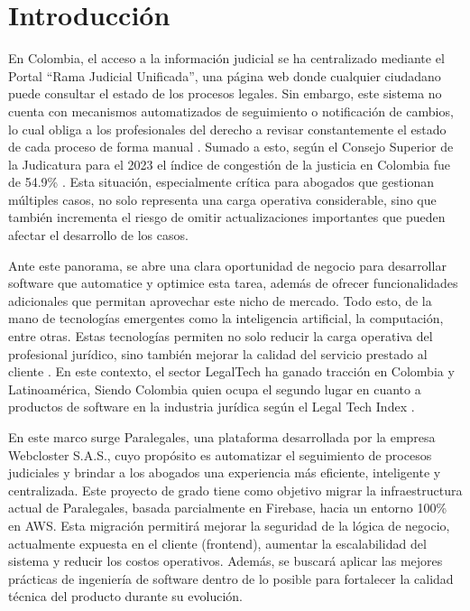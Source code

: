 \newpage
\section{Introducción}

En Colombia, el acceso a la información judicial se ha centralizado mediante el Portal  “Rama Judicial Unificada”, una página web donde cualquier ciudadano puede consultar el estado de los procesos legales. Sin embargo, este sistema no cuenta con mecanismos automatizados de seguimiento o notificación de cambios, lo cual obliga a los profesionales del derecho a revisar constantemente el estado de cada proceso de forma manual \cite{Paez2024}. Sumado a esto,  según el Consejo Superior de la Judicatura para el 2023 el índice de congestión de la justicia en Colombia fue de 54.9\% \cite{Rozo2024}. Esta situación, especialmente crítica para abogados que gestionan múltiples casos, no solo representa una carga operativa considerable, sino que también incrementa el riesgo de omitir actualizaciones importantes que pueden afectar el desarrollo de los casos.

Ante este panorama, se abre una clara oportunidad de negocio para desarrollar software que automatice y optimice esta tarea, además de ofrecer funcionalidades adicionales que permitan aprovechar este nicho de mercado. Todo esto, de la mano de tecnologías emergentes como la inteligencia artificial, la computación, entre otras. Estas tecnologías permiten no solo reducir la carga operativa del profesional jurídico, sino también mejorar la calidad del servicio prestado al cliente \cite{Botero2023}. En este contexto, el sector LegalTech ha ganado tracción en Colombia y Latinoamérica, Siendo Colombia quien ocupa el segundo lugar en cuanto a productos de software en la industria jurídica según el Legal Tech Index \cite{Sierra2023}.

En este marco surge Paralegales, una plataforma desarrollada por la empresa Webcloster S.A.S., cuyo propósito es automatizar el seguimiento de procesos judiciales y brindar a los abogados una experiencia más eficiente, inteligente y centralizada. Este proyecto de grado tiene como objetivo migrar la infraestructura actual de Paralegales, basada parcialmente en Firebase, hacia un entorno 100\% en AWS. Esta migración permitirá mejorar la seguridad de la lógica de negocio, actualmente expuesta en el cliente (frontend), aumentar la escalabilidad del sistema y reducir los costos operativos. Además, se buscará aplicar las mejores prácticas de ingeniería de software dentro de lo posible para fortalecer la calidad técnica del producto durante su evolución.
